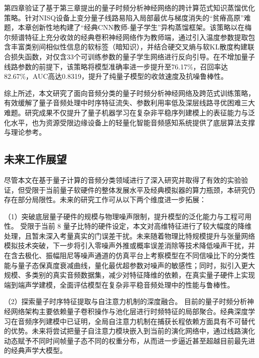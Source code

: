 第四章验证了基于第三章提出的量子时频分析神经网络的跨计算范式知识蒸馏优化策略。针对NISQ设备上变分量子线路易陷入局部最优与梯度消失的“贫瘠高原”难题，本章创新性地构建了“经典CNN教师-量子学生”异构蒸馏框架。该策略以在梅尔频谱特征上充分收敛的经典卷积神经网络作为教师端，通过引入温度参数提取包含丰富类别间相似性信息的软标签（暗知识），并结合硬交叉熵与软KL散度构建联合损失函数，对仅含33个可训练参数的量子学生网络进行反向引导。在不增加量子线路参数的前提下，该策略将模型准确率进一步提升至76.17\%，召回率达82.67\%，AUC高达0.8319，提升了纯量子模型的收敛速度及抗噪鲁棒性。

综上所述，本文研究了面向音频分类的量子时频分析神经网络及跨范式训练策略，有效缓解了量子音频处理中时序特征流失、参数利用率低及深层线路寻优困难三大难题。研究成果不仅提升了量子机器学习在复杂非平稳序列建模上的表征能力与泛化水平，也为资源受限边缘设备上的轻量化智能音频感知系统提供了底层算法支撑与理论参考。

\subsection{未来工作展望}
\label{sec:future_work}

尽管本文在基于量子计算的音频分类领域进行了深入研究并取得了有效的实验验证，但受限于当前量子软硬件的整体发展水平及经典模拟器的算力瓶颈，本研究仍存在部分局限性。未来的研究工作可从以下两个维度进一步拓展：

（1）突破底层量子硬件的规模与物理噪声限制，提升模型的泛化能力与工程可用性。
受限于当前 8 量子比特的硬件设定，本文对高维特征进行了较大幅度的降维处理，且暂未深入考量真实的门误差干扰。未来随着物理比特规模提升与张量网络模拟技术突破，下一步将引入零噪声外推或概率误差消除等技术降低噪声干扰，并在含去极化、振幅阻尼等噪声通道的仿真平台上考察模型在不同信噪比下的分类性能与量子态保真度衰减曲线，量化最优超参数对噪声的敏感性；同时，拟引入更大规模、多类别的真实音频数据集，减少对特征降维的依赖，在真实量子硬件上实现端到端声学建模，全面评估模型在复杂非平稳音频处理中的性能与鲁棒性。

（2）探索量子时序特征提取与自注意力机制的深度融合。
目前的量子时频分析神经网络架构主要依赖量子卷积操作与池化层进行时频特征的局部聚合。经典深度学习在音频序列建模中已证明，全局自注意力机制在捕获长程依赖方面具有不可替代的优势。未来将尝试把量子自注意力模块嵌入到当前的演化网络中，通过线路演化动态赋予不同时间帧量子态不同的权重分布，从而进一步逼近甚至超越目前最先进的经典声学大模型。